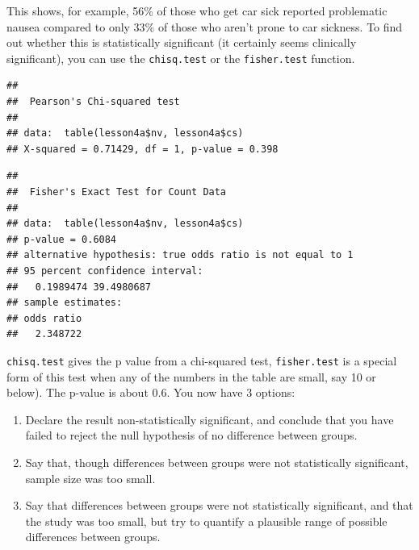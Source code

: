 \documentclass[]{book}
\newenvironment{Shaded}{\begin{snugshade}}{\end{snugshade}}
\newcommand{\DataTypeTok}[1]{\textcolor[rgb]{0.13,0.29,0.53}{#1}}
\newcommand{\KeywordTok}[1]{\textcolor[rgb]{0.13,0.29,0.53}{\textbf{#1}}}
\newcommand{\NormalTok}[1]{#1}
\newcommand{\OperatorTok}[1]{\textcolor[rgb]{0.81,0.36,0.00}{\textbf{#1}}}
\newcommand{\OtherTok}[1]{\textcolor[rgb]{0.56,0.35,0.01}{#1}}
\providecommand{\tightlist}{%
  \setlength{\itemsep}{0pt}\setlength{\parskip}{0pt}}
\begin{document}
This shows, for example, 56\% of those who get car sick reported problematic nausea compared to only 33\% of those who aren't prone to car sickness. To find out whether this is statistically significant (it certainly seems clinically significant), you can use the \texttt{chisq.test} or the \texttt{fisher.test} function.

\begin{Shaded}
\end{Shaded}

\begin{verbatim}
## 
##  Pearson's Chi-squared test
## 
## data:  table(lesson4a$nv, lesson4a$cs)
## X-squared = 0.71429, df = 1, p-value = 0.398
\end{verbatim}

\begin{Shaded}
\end{Shaded}

\begin{verbatim}
## 
##  Fisher's Exact Test for Count Data
## 
## data:  table(lesson4a$nv, lesson4a$cs)
## p-value = 0.6084
## alternative hypothesis: true odds ratio is not equal to 1
## 95 percent confidence interval:
##   0.1989474 39.4980687
## sample estimates:
## odds ratio 
##   2.348722
\end{verbatim}

\texttt{chisq.test} gives the p value from a chi-squared test, \texttt{fisher.test} is a special form of this test when any of the numbers in the table are small, say 10 or below). The p-value is about 0.6. You now have 3 options:

\begin{enumerate}
\def\labelenumi{\arabic{enumi}.}
\tightlist
\item
  Declare the result non-statistically significant, and conclude that you have failed to reject the null hypothesis of no difference between groups.
\item
  Say that, though differences between groups were not statistically significant, sample size was too small.
\item
  Say that differences between groups were not statistically significant, and that the study was too small, but try to quantify a plausible range of possible differences between groups.
\end{enumerate}
\end{document}
